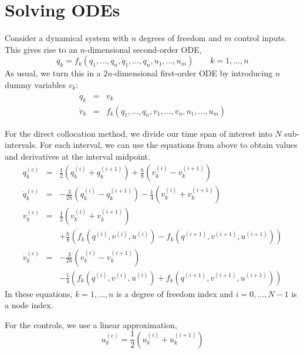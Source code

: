 \documentclass[a4paper]{article}
\begin{document}
\section{Solving ODEs}
Consider a dynamical system with $n$ degrees of freedom and $m$ control inputs. This gives rise to an $n$-dimensional second-order ODE,
\begin{equation}
\ddot{q}_k = f_k(q_1, \ldots, q_n, \dot{q}_1, \ldots, \dot{q}_n, u_1, \ldots, u_m)
\qquad k = 1,\ldots,n
\end{equation}
As usual, we turn this in a $2n$-dimensional first-order ODE by introducing $n$ dummy variables $v_k$:
\begin{eqnarray}
\dot{q}_k &=& v_k\\
\dot{v}_k &=& f_k(q_1, \ldots, q_n, v_1, \ldots, v_n, u_1, \ldots, u_m)\nonumber
\end{eqnarray}

For the direct collocation method, we divide our time span of interest into $N$ sub-intervals. For each interval, we can use the equations from above to obtain values and derivatives at the interval midpoint.
\begin{eqnarray}
q_k^{(c)} &=& \frac{1}{2} \left( q_k^{(i)} + q_k^{(i+1)} \right) +
    \frac{h}{8} \left( v_k^{(i)} - v_k^{(i+1)} \right)\\
\dot{q}_k^{(c)} &=& -\frac{3}{2h} \left( q_k^{(i)} - q_k^{(i+1)} \right) -
    \frac{1}{4} \left( v_k^{(i)} + v_k^{(i+1)} \right)\\
v_k^{(c)} &=& \frac{1}{2} \left( v_k^{(i)} + v_k^{(i+1)} \right)\\
    &&+ \frac{h}{8} \left( f_k(q^{(i)}, v^{(i)}, u^{(i)}) - f_k(q^{(i+1)}, v^{(i+1)}, u^{(i+1)}) \right)
\nonumber \\
\dot{v}_k^{(c)} &=& - \frac{3}{2h} \left( v_k^{(i)} - v_k^{(i+1)} \right)\\
    &&- \frac{1}{4} \left( f_k(q^{(i)}, v^{(i)}, u^{(i)}) + f_k(q^{(i+1)}, v^{(i+1)}, u^{(i+1)}) \right)
\nonumber
\end{eqnarray}
In these equations, $k = 1,\ldots,n$ is a degree of freedom index and $i = 0,\ldots,N-1$ is a node index.

For the controls, we use a linear approximation,
\begin{equation}
u_k^{(c)} = \frac{1}{2} \left( u_k^{(i)} + u_k^{(i+1)} \right)
\end{equation}
\end{document}
